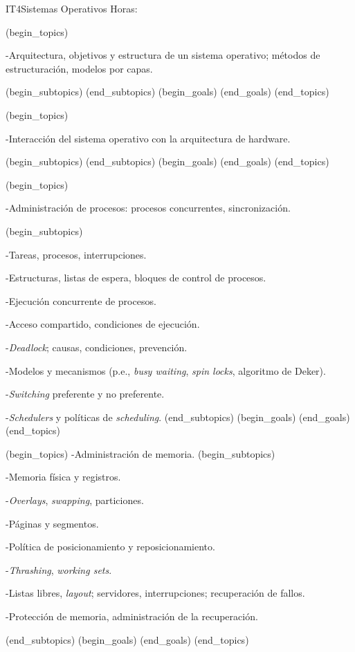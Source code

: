 \begin{BKL2}{IT4}{Sistemas Operativos}
Horas:
 
(begin_topics)

-Arquitectura, objetivos y estructura de un sistema operativo; métodos de estructuración, modelos por capas.

(begin_subtopics)
(end_subtopics)
(begin_goals)
(end_goals)
(end_topics)

 

(begin_topics)

-Interacción del sistema operativo con la arquitectura de hardware.

(begin_subtopics)
(end_subtopics)
(begin_goals)
(end_goals)
(end_topics)

 

(begin_topics)

-Administración de procesos: procesos concurrentes, sincronización.

(begin_subtopics)

-Tareas, procesos, interrupciones.

-Estructuras, listas de espera, bloques de control de procesos.

-Ejecución concurrente de procesos.

-Acceso compartido, condiciones de ejecución.

-{\it Deadlock}; causas, condiciones, prevención.

-Modelos y mecanismos (p.e., {\it busy waiting}, {\it spin locks}, algoritmo de Deker).

-{\it Switching} preferente y no preferente.

-{\it Schedulers} y políticas de {\it scheduling}.
(end_subtopics)
(begin_goals)
(end_goals)
(end_topics)

 

(begin_topics)
-Administración de memoria.
(begin_subtopics)

-Memoria física y registros.

-{\it Overlays}, {\it swapping}, particiones.

-Páginas y segmentos.

-Política de posicionamiento y reposicionamiento.

-{\it Thrashing}, {\it working sets}.

-Listas libres, {\it layout}; servidores, interrupciones; recuperación de fallos.

-Protección de memoria, administración de la recuperación.

(end_subtopics)
(begin_goals)
(end_goals)
(end_topics)


\end{BKL2}
